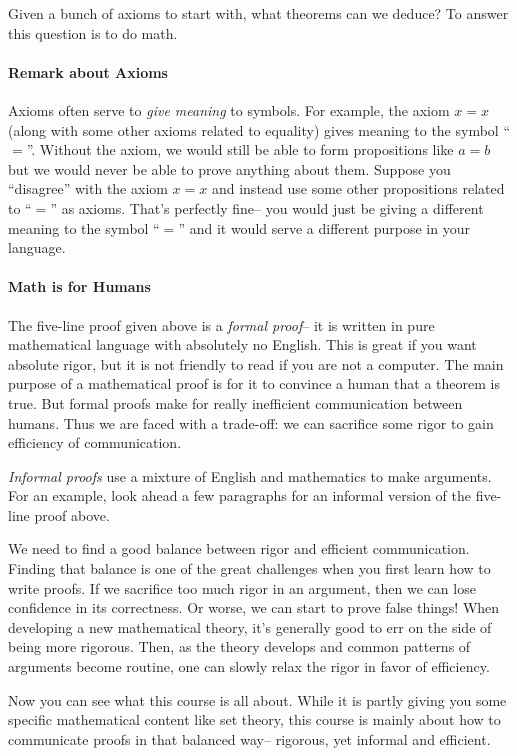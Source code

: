 \documentclass[12pt]{article}
\begin{document}
Given a bunch of axioms to start with, what theorems can we deduce?
To answer this question is to do math.

\paragraph{Remark about Axioms}
Axioms often serve to \emph{give meaning} to symbols.
For example, the axiom $x=x$ (along with some other axioms related to equality)
gives meaning to the symbol ``$=$''.
Without the axiom, we would still be able to form propositions like $a=b$ but we would never be able to
prove anything about them.
Suppose you ``disagree'' with the axiom $x=x$ and instead use some other propositions related to ``$=$'' as axioms.
That's perfectly fine-- you would just be giving a different meaning to the symbol ``$=$'' and it would serve a different purpose in your language.

\paragraph{Math is for Humans}
The five-line proof given above is a \emph{formal proof}-- it is written in pure mathematical language
with absolutely no English.
This is great if you want absolute rigor, but
it is not friendly to read if you are not a computer.
The main purpose of a mathematical proof is for it to convince a human that a theorem is true.
But formal proofs make for really inefficient communication between humans.
Thus we are faced with a trade-off: 
we can sacrifice some rigor to gain efficiency of communication.

\emph{Informal proofs} use a mixture of English and mathematics to make arguments.
For an example, look ahead a few paragraphs for an informal version of the five-line proof above.

We need to find a good balance between rigor and efficient communication.
Finding that balance is one of the great challenges when you first learn how to write proofs.
If we sacrifice too much rigor in an argument, then we can lose confidence in its correctness.
Or worse, we can start to prove false things!
When developing a new mathematical theory, it's generally good to err on the side of being more rigorous.
Then, as the theory develops and common patterns of arguments become routine,
one can slowly relax the rigor in favor of efficiency.

Now you can see what this course is all about.
While it is partly giving you some specific mathematical content like set theory,
this course is mainly about how to communicate proofs in that balanced way-- rigorous, yet informal and efficient.
\end{document}
